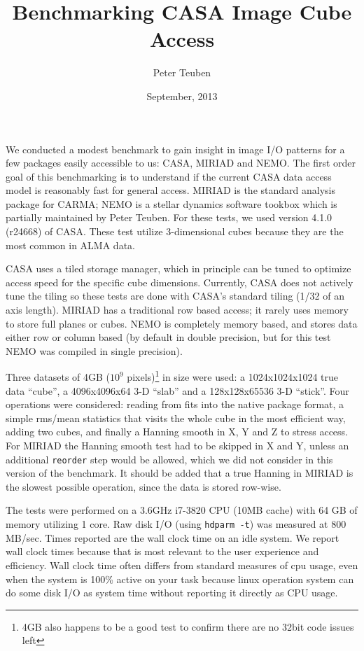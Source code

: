 \documentclass{article}
\title{Benchmarking CASA Image Cube Access}
\author{Peter Teuben}
\date{September, 2013}
\begin{document}
\maketitle


We conducted a modest benchmark to gain insight in image
I/O patterns for a few packages easily accessible to us: CASA,
MIRIAD and NEMO. The first order goal of this benchmarking is
to understand if the
current CASA data access model is reasonably fast for general
access.
MIRIAD is the standard analysis package for
CARMA; NEMO is a stellar dynamics software tookbox which is
partially maintained by Peter Teuben. For these tests, we
used version 4.1.0 (r24668) of CASA. These test utilize 3-dimensional cubes
because they are the most common in ALMA data.

CASA uses a tiled storage manager, which in principle
can be tuned to optimize access speed for the specific
cube dimensions.  Currently, CASA does not actively tune
the tiling so these tests are done with CASA's standard tiling
(1/32 of an axis length).
MIRIAD has a traditional row based access; it rarely
uses memory to store full planes or cubes. NEMO is completely
memory based, and stores data either row or column based
(by default in double precision, but for this test NEMO was compiled 
in single precision).

Three datasets of 4GB ($10^9$ pixels)\footnote{4GB also happens to
be a good test to confirm there are no 32bit code issues left}
in size were used:
a 1024x1024x1024 true data ``cube'',
a 4096x4096x64 3-D ``slab'' and a 128x128x65536 3-D ``stick''.
Four operations were considered:  reading from fits
into the native package format,
a simple rms/mean statistics that visits the whole cube in the
most efficient way, adding two cubes, and finally
a Hanning smooth in X, Y and Z to stress access.
For MIRIAD
the Hanning smooth test had to be skipped in X and Y, unless
an additional {\tt reorder} step would be allowed, which we did
not consider in this version of the benchmark.
It should be added that a true Hanning in MIRIAD
is the slowest possible operation, since the data is stored
row-wise.

The tests were performed on a 3.6GHz i7-3820 CPU (10MB cache) with 64
GB of memory utilizing 1 core.  Raw disk I/O (using {\tt hdparm -t})
was measured at 800 MB/sec. Times reported are the wall clock time on
an idle system. 
We report wall clock times because that is most relevant to the
user experience and efficiency. Wall clock time often differs from
standard measures of cpu usage, even when the system is 100\% active
on your task because linux operation system can do some disk I/O
as system time without reporting it directly as CPU usage.
\end{document}
